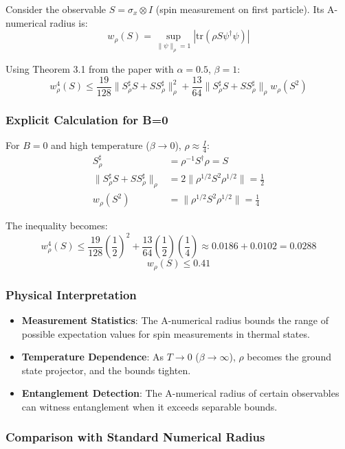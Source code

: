 \documentclass{article}
\newcommand {\tr}{\mathrm{tr}}
\begin{document}
Consider the observable $S = \sigma_x \otimes I$ (spin measurement on first particle). Its A-numerical radius is:
\[ w_\rho(S) = \sup_{\|\psi\|_\rho=1} |\tr(\rho S \psi^\dagger \psi)| \]

Using Theorem 3.1 from the paper with $\alpha=0.5$, $\beta=1$:
\[ w_\rho^4(S) \leq \frac{19}{128}\|S^\sharp_\rho S + SS^\sharp_\rho\|_\rho^2 + \frac{13}{64}\|S^\sharp_\rho S + SS^\sharp_\rho\|_\rho w_\rho(S^2) \]

\subsubsection*{Explicit Calculation for B=0}

For $B=0$ and high temperature ($\beta \to 0$), $\rho \approx \frac{I}{4}$:
\begin{align*}
S^\sharp_\rho &= \rho^{-1} S^\dagger \rho = S \\
\|S^\sharp_\rho S + SS^\sharp_\rho\|_\rho &= 2\|\rho^{1/2} S^2 \rho^{1/2}\| = \frac{1}{2} \\
w_\rho(S^2) &= \|\rho^{1/2} S^2 \rho^{1/2}\| = \frac{1}{4}
\end{align*}

The inequality becomes:
\[ w_\rho^4(S) \leq \frac{19}{128}\left(\frac{1}{2}\right)^2 + \frac{13}{64}\left(\frac{1}{2}\right)\left(\frac{1}{4}\right) \approx 0.0186 + 0.0102 = 0.0288 \]
\[ w_\rho(S) \leq 0.41 \]

\subsubsection{Physical Interpretation}
\begin{itemize}
  \item \textbf{Measurement Statistics}: The A-numerical radius bounds the range of possible expectation values for spin measurements in thermal states.
  \item  \textbf{Temperature Dependence}: As $T \to 0$ ($\beta \to \infty$), $\rho$ becomes the ground state projector, and the bounds tighten.
  \item  \textbf{Entanglement Detection}: The A-numerical radius of certain observables can witness entanglement when it exceeds separable bounds.
\end{itemize}
\subsubsection{Comparison with Standard Numerical Radius}
\end{document}
